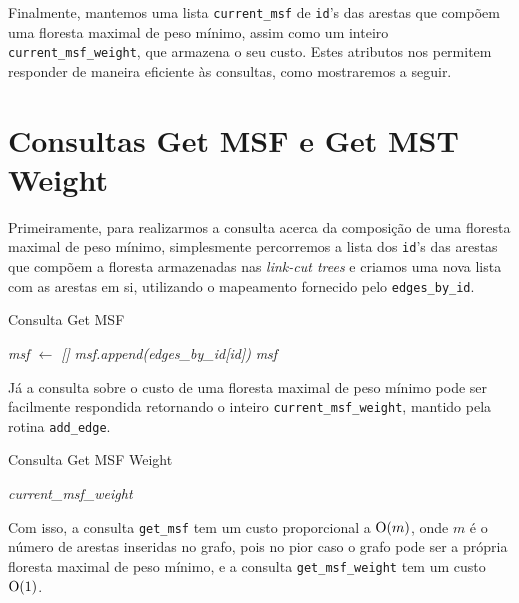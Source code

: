 Finalmente, mantemos uma lista \texttt{current\_msf} de \texttt{id}'s das arestas que compõem uma floresta maximal de peso mínimo, assim como um inteiro \texttt{current\_msf\_weight}, que armazena o seu custo. Estes atributos nos permitem responder de maneira eficiente às consultas, como mostraremos a seguir.

\section{Consultas Get MSF e Get MST Weight}
\label{sec:imsf-get-msf}

Primeiramente, para realizarmos a consulta acerca da composição de uma floresta maximal de peso mínimo, simplesmente percorremos a lista dos \texttt{id}'s das arestas que compõem a floresta armazenadas nas \emph{link-cut trees} e criamos uma nova lista com as arestas em si, utilizando o mapeamento fornecido pelo \texttt{edges\_by\_id}.

\begin{algorithm}[h!]
    \caption{Consulta Get MSF}\label{imsf-get-msf}
    \begin{algorithmic}[1]
        \State \emph{msf $\gets$ []}
        \State \emph{msf.append(edges\_by\_id[id])}
        \EndFor
        \State \Return \emph{msf}
        \EndFunction
    \end{algorithmic}
\end{algorithm}

Já a consulta sobre o custo de uma floresta maximal de peso mínimo pode ser facilmente respondida retornando o inteiro \texttt{current\_msf\_weight}, mantido pela rotina \texttt{add\_edge}.

\begin{algorithm}[h!]
    \caption{Consulta Get MSF Weight}\label{imsf-get-msf-weight}
    \begin{algorithmic}[1]
        \State \Return \emph{current\_msf\_weight}
        \EndFunction
    \end{algorithmic}
\end{algorithm}

Com isso, a consulta \texttt{get\_msf} tem um custo proporcional a $\mathrm{O}(m)$, onde $m$ é o número de arestas inseridas no grafo, pois no pior caso o grafo pode ser a própria floresta maximal de peso mínimo, e a consulta \texttt{get\_msf\_weight} tem um custo $\mathrm{O}(1)$.

